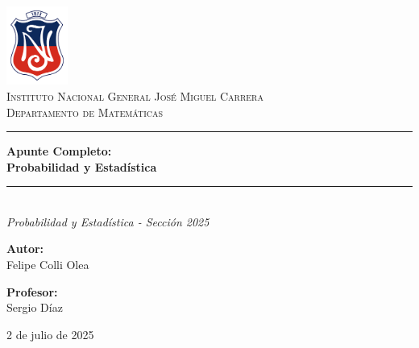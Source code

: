 \documentclass[12pt, letterpaper]{article}
\begin{document}
\begin{titlepage}
    \centering
    \includegraphics[width=2cm]{IN}\\[2cm] 
    \textsc{\LARGE  Instituto Nacional General José Miguel Carrera}\\[0.5cm]
    \textsc{\Large Departamento de Matemáticas}\\[1.5cm] %
    
    \rule{\textwidth}{1.5pt}\vspace{0.4cm}
    {\Huge \bfseries Apunte Completo: \\[0.5cm] Probabilidad y Estadística}\\[0.4cm] %
    \rule{\textwidth}{1.5pt}\\[1.5cm]
    
    {\Large \textit{ Probabilidad y Estadística - Sección 2025}}\\[2cm] %
    
    \begin{minipage}{0.45\textwidth}
        \begin{flushleft} \large
            \textbf{Autor:}\\ 
            Felipe Colli Olea
        \end{flushleft}
    \end{minipage}
    \hfill
    \begin{minipage}{0.45\textwidth}
        \begin{flushright} \large
            \textbf{Profesor:}\\
            Sergio Díaz
        \end{flushright}
    \end{minipage}

    \vfill
    
    {\large 2 de julio de 2025}
\end{titlepage}
\end{document}
